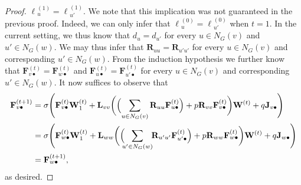 \begin{proof}
 $\pmb{\ell}{}^{(1)}_u=\pmb{\ell}{}^{(1)}_{u'}$. We note that this implication was not guaranteed in the previous proof. Indeed, we can only infer that  $\pmb{\ell}{}^{(0)}_u=\pmb{\ell}{}^{(0)}_{u'}$ when $t=1$. 
In the current setting, we thus know that $d_{u}=d_{u'}$ for every $u\in N_G(v)$ and $u'\in N_G(w)$. We may thus infer that $\mathbf{R}_{uu}=\mathbf{R}_{u'u'}$ for every $u\in N_G(v)$ and corresponding $u'\in N_G(w)$.
 From the induction hypothesis we further know that 
 $\mathbf{F}^{(t)}_{v\bullet}=\mathbf{F}^{(t)}_{w\bullet}$ and 
 $\mathbf{F}^{(t)}_{u\bullet}=\mathbf{F}^{(t)}_{u'\bullet}$ for  every $u\in N_G(v)$ and corresponding $u'\in N_G(w)$.
%
%
  It now suffices to observe that
  \begin{align*}
	  \mathbf{F}^{(t+1)}_{v\bullet}&=\sigma\Biggl(\mathbf{F}^{(t)}_{v\bullet}\mathbf{W}_1^{(t)}+\mathbf{L}_{vv}\biggl(\Bigl(\sum_{u\in N_G(v)} \mathbf{R}_{uu}\mathbf{F}^{(t)}_{u\bullet}\Bigr)+p\mathbf{R}_{vv}\mathbf{F}^{(t)}_{v\bullet}\biggr)\mathbf{W}^{(t)}+ q\mathbf{J}_{v\bullet}\Biggr)\\
	 & =\sigma\Biggl(\mathbf{F}^{(t)}_{w\bullet}\mathbf{W}_1^{(t)}+\mathbf{L}_{ww}\biggl(\Bigl(\!\!\sum_{u'\in N_G(w)}\!\! \mathbf{R}_{u'u'}\mathbf{F}^{(t)}_{u'\bullet}\Bigr)+p\mathbf{R}_{ww}\mathbf{F}^{(t)}_{w\bullet}\biggr)\mathbf{W}^{(t)}+ q\mathbf{J}_{w\bullet}\Biggr)\\
	  &=\mathbf{F}^{(t+1)}_{w\bullet},
\end{align*}
as desired.
\end{proof}

